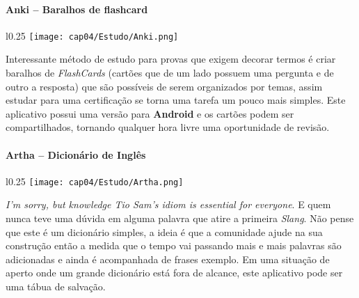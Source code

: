 \paragraph{Anki – Baralhos de flashcard}
\begin{minipage}{\linewidth}
 \vspace{5pt}
 \begin{wrapfigure}{l}{0.25\textwidth}
  \vspace{-\baselineskip}
  \texttt{[image: cap04/Estudo/Anki.png]} 
 \end{wrapfigure}
 Interessante método de estudo para provas que exigem decorar termos é criar baralhos de \textit{FlashCards} (cartões que de um lado possuem uma pergunta e de outro a resposta) que são possíveis de serem organizados por temas, assim estudar para uma certificação se torna uma tarefa um pouco mais simples. Este aplicativo possui uma versão para \textbf{Android} e os cartões podem ser compartilhados, tornando qualquer hora livre uma oportunidade de revisão.
\end{minipage}

\paragraph{Artha – Dicionário de Inglês}
\begin{minipage}{\linewidth}
 \vspace{5pt}
 \begin{wrapfigure}{l}{0.25\textwidth}
  \vspace{-\baselineskip}
  \texttt{[image: cap04/Estudo/Artha.png]} 
 \end{wrapfigure}
 \textit{I'm sorry, but knowledge Tio Sam's idiom is essential for everyone}. E quem nunca teve uma dúvida em alguma palavra que atire a primeira \textit{Slang}. Não pense que este é um dicionário simples, a ideia é que a comunidade ajude na sua construção então a medida que o tempo vai passando mais e mais palavras são adicionadas e ainda é acompanhada de frases exemplo. Em uma situação de aperto onde um grande dicionário está fora de alcance, este aplicativo pode ser uma tábua de salvação.
\end{minipage}

